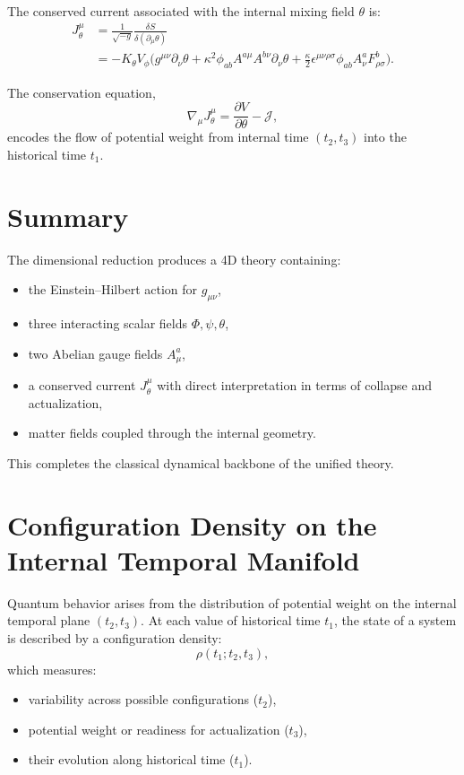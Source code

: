 \documentclass[12pt]{article}
\begin{document}
The conserved current associated with the internal mixing field \(\theta\) is:
\begin{align}
J^\mu_\theta
&=
\frac{1}{\sqrt{-g}}
\frac{\delta S}{\delta(\partial_\mu\theta)}
\nonumber\\
&=
-K_\theta V_\phi
\Big(
g^{\mu\nu}\partial_\nu\theta
+\kappa^2 \phi_{ab}A^{a\mu}A^{b\nu}\partial_\nu\theta
+\frac{\kappa}{2}
\epsilon^{\mu\nu\rho\sigma}
\phi_{ab}A^a_\nu F^b_{\rho\sigma}
\Big).
\label{eq:Jtheta}
\end{align}

The conservation equation,
\[
\nabla_\mu J^\mu_\theta = \frac{\partial V}{\partial\theta} - \mathcal{J},
\]
encodes the flow of potential weight from internal time \((t_2,t_3)\) into the 
historical time \(t_1\).


\newpage
\section{Summary}

The dimensional reduction produces a 4D theory containing:
\begin{itemize}
\item the Einstein–Hilbert action for \(g_{\mu\nu}\),
\item three interacting scalar fields \(\Phi,\psi,\theta\),
\item two Abelian gauge fields \(A^a_\mu\),
\item a conserved current \(J^\mu_\theta\) with direct interpretation in terms of
collapse and actualization,
\item matter fields coupled through the internal geometry.
\end{itemize}

This completes the classical dynamical backbone of the unified theory.


\newpage
\section{Configuration Density on the Internal Temporal Manifold}

Quantum behavior arises from the distribution of potential weight on the
internal temporal plane \((t_2, t_3)\). At each value of historical time \(t_1\),
the state of a system is described by a configuration density:
\begin{equation}
\rho(t_1; t_2, t_3),
\end{equation}
which measures:
\begin{itemize}
\item variability across possible configurations (\(t_2\)),
\item potential weight or readiness for actualization (\(t_3\)),
\item their evolution along historical time (\(t_1\)).
\end{itemize}
\end{document}
